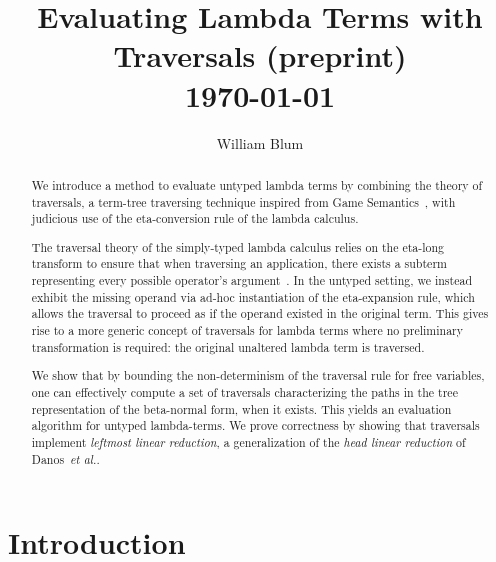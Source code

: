 \documentclass{elsarticle}
\author{William Blum}
\title{Evaluating Lambda Terms with Traversals (preprint)
\\ \vspace*{1em}
\today}
\makeatletter
\theoremstyle{plain}
\theoremstyle{definition}
\theoremstyle{remark}
\def\etal{\textit{et al.}\@\xspace}
\makeatother
\begin{document}
\begin{abstract}
    We introduce a method to evaluate untyped lambda terms by combining the theory of traversals, a term-tree traversing technique inspired from Game Semantics~\cite{OngLics2006,BlumPhd}, with judicious use of the eta-conversion rule of the lambda calculus.

    The traversal theory of the simply-typed lambda calculus relies on the eta-long transform to ensure that when traversing an application, there exists a subterm representing every possible operator's argument~\cite{BlumPhd, OngLics2006}. In the untyped setting, we instead exhibit the missing operand via ad-hoc instantiation of the eta-expansion rule, which allows the traversal to proceed as if the operand existed in the original term. This gives rise to a more generic concept of traversals for lambda terms where no preliminary transformation is required: the original unaltered lambda term is traversed.


    We show that by bounding the non-determinism of the traversal rule for free variables, one can effectively compute a set of traversals characterizing the paths in the tree representation of the beta-normal form, when it exists. This yields an evaluation algorithm for untyped lambda-terms. We prove correctness by showing that traversals implement \emph{leftmost linear reduction}, a generalization of the \emph{head linear reduction} of Danos~\etal \cite{danos-head,danosherbelinregnier1996}.
\end{abstract}

\maketitle


\section{Introduction}
\end{document}
